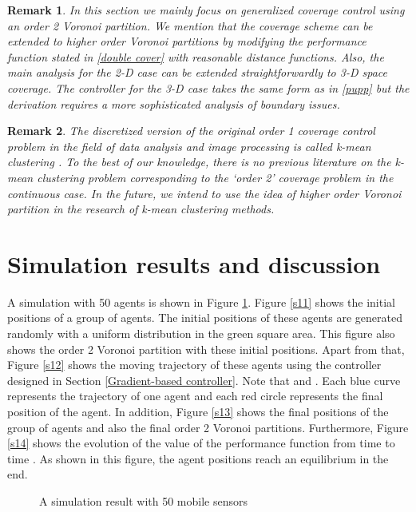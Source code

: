 \documentclass[letterpaper, 10 pt, conference]{ieeeconf}
\newtheorem{remark}{Remark}
\begin{document}
\begin{remark}
In this section we mainly focus on generalized coverage control using an order 2 Voronoi partition. We mention that the coverage scheme can be extended to higher order Voronoi partitions by modifying the performance function stated in \eqref{double cover} with reasonable distance functions. Also, the main analysis for the 2-D case can be extended straightforwardly to 3-D space coverage. The controller for the 3-D case takes the same form as in \eqref{pupp} but the derivation requires a more sophisticated analysis of boundary issues.
\end{remark}
\begin{remark}
The discretized version of the original order 1 coverage control problem in the field of data analysis and image processing is called k-mean clustering \cite{du1999centroidal}. To the best of our knowledge, there is no previous literature on the k-mean clustering problem corresponding to the `order 2' coverage problem in the continuous case. In the future, we intend to use the idea of higher order Voronoi partition in the research of k-mean clustering methods.
\end{remark}

\section{Simulation results and discussion}





A simulation with 50 agents is shown in Figure \ref{50SensorResult}. Figure \ref{s11} shows the initial positions of a group of agents. The initial positions of these agents are generated randomly with a uniform distribution in the green square area. This figure also shows the order 2 Voronoi partition with these initial positions. Apart from that, Figure \ref{s12} shows the moving trajectory of these agents using the controller designed in Section \ref{Gradient-based controller}. Note that  and . Each blue curve represents the trajectory of one agent and each red circle represents the final position of the agent. In addition, Figure \ref{s13} shows the final positions of the group of agents and also the final order 2 Voronoi partitions. Furthermore, Figure \ref{s14} shows the evolution of the value of the performance function from time  to time . As shown in this figure, the agent positions reach an equilibrium in the end.

\begin{figure}[!ht]
\caption{A simulation result with 50 mobile sensors}\label{50SensorResult}
\end{figure}
\end{document}
